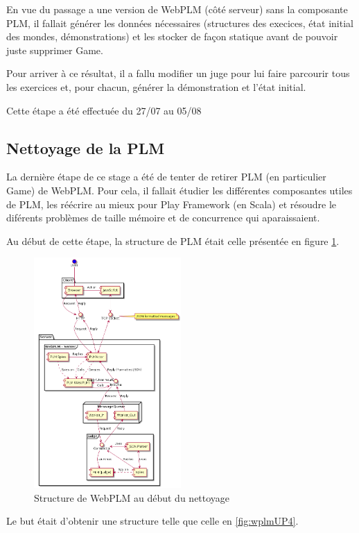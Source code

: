 \documentclass[stage]{tnreport}
\begin{document}
En vue du passage a une version de WebPLM (côté serveur) sans la composante PLM, il fallait générer les données nécessaires (structures des execices, état initial des mondes, démonstrations) et les stocker de façon statique avant de pouvoir juste supprimer Game.

Pour arriver à ce résultat, il a fallu modifier un juge pour lui faire parcourir tous les exercices et, pour chacun, générer la démonstration et l'état initial.

Cette étape a été effectuée du 27/07 au 05/08

\subsection{Nettoyage de la PLM}

La dernière étape de ce stage a été de tenter de retirer PLM (en particulier Game) de WebPLM. Pour cela, il fallait étudier les différentes composantes utiles de PLM, les réécrire au mieux pour Play Framework (en Scala) et résoudre le diférents problèmes de taille mémoire et de concurrence qui aparaissaient.

Au début de cette étape, la structure de PLM était celle présentée en figure \ref{fig:wplmUP3}.
\begin{figure}[h]
	\centering
		\includegraphics[width=0.5\textwidth]{figures/WebPLM-uml-cp3}
	\caption{Structure de WebPLM au début du nettoyage}
	\label{fig:wplmUP3}
\end{figure}

Le but était d'obtenir une structure telle que celle en \ref{fig:wplmUP4}.
\end{document}
